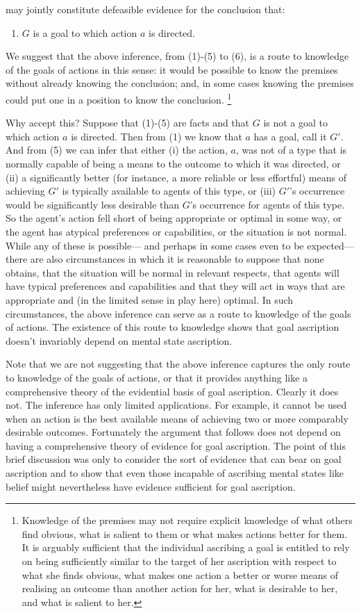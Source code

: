 \documentclass[14pt,a4paper]{extarticle}
\begin{document}
%
may jointly constitute defeasible evidence for the conclusion that:
%
\begin{enumerate}[resume]
\item $G$ is a goal to which action $a$ is directed.
\end{enumerate}
%
We suggest that the above inference, from (1)-(5) to (6), is a route to knowledge of the goals of actions in this sense:
it would be possible to know the premises without already knowing the conclusion;
and, 
in some cases knowing the premises could put one in a position to know the conclusion.%
\footnote{
Knowledge of the premises may not require explicit knowledge of what others find obvious, what is salient to them or what makes actions better for them.
It is arguably sufficient that
the individual ascribing a goal 
is entitled to 
rely on being sufficiently similar to the target of her ascription 
with respect to 
	what she finds obvious, 
	what makes one action a better or worse means of realising an outcome than another action for her,  
	what is desirable to her,
	and what is salient to her.
}

Why accept this?
Suppose that 
	(1)-(5) are facts 
and that
	$G$ is not a goal to which action $a$ is directed.
Then from (1) we know that $a$ has a goal, call it $G'$.
And from (5) we can infer that either 
(i) 
the action, $a$, was not of a type that is normally capable 
of being a means to the outcome to which it was directed,
or
(ii) 
a significantly better (for instance, a more reliable or less effortful) means of achieving $G'$ is typically available to agents of this type,
or
(iii)
$G'$'s occurrence would be significantly less desirable than $G$'s occurrence for agents of this type.
So the agent's action fell short of being appropriate or optimal in some way,
or the agent has atypical preferences or capabilities,
or the situation is not normal.
While any of these is possible---%
and perhaps in some cases even to be expected---%
there are also circumstances in which it is reasonable to suppose that none obtains,
that the situation will be normal in relevant respects,
that agents will have typical preferences and capabilities 
and that they will act in ways that are appropriate and (in the limited sense in play here) optimal.
In such circumstances, the above inference can serve as a route to knowledge of the goals of actions.
The existence of this route to knowledge shows that goal ascription doesn't invariably depend on mental state ascription.

Note that we are not suggesting that the above inference captures the only route to knowledge of the goals of actions,
or that it provides anything like a comprehensive theory of the evidential basis of goal ascription.
Clearly it does not.
The inference has only limited applications.
For example, it cannot be used when an action is the best available means of achieving two or more comparably desirable outcomes. 
Fortunately the argument that follows does not depend on having a comprehensive theory of evidence for goal ascription.
The point of this brief discussion was only to 
consider the sort of evidence that can bear on goal ascription
and to 
show that 
even those incapable of ascribing mental states like belief 
might nevertheless have evidence sufficient for goal ascription.
\end{document}
